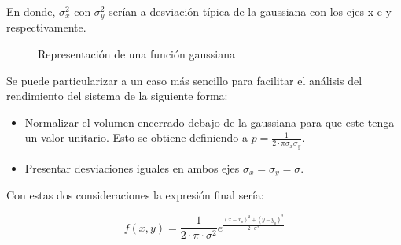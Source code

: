En donde, $\sigma^{2}_{x}$ con $\sigma^{2}_{y}$ serían a desviación típica de la gaussiana con los ejes x e y respectivamente.

\begin{figure}[htb]
  \begin{center}
    \caption{Representación de una función gaussiana}
    \label{FunGauss}
  \end{center}
\end{figure}


Se puede particularizar a un caso más sencillo para facilitar el análisis del rendimiento del sistema de la siguiente forma:

\begin{itemize}
	\item Normalizar el volumen encerrado debajo de la gaussiana para que este tenga un valor unitario. Esto se obtiene definiendo a $p=\frac{1}{2\cdot{\pi}\sigma_{x}\sigma_{y}}$.
	\item Presentar desviaciones iguales en ambos ejes $\sigma_{x}=\sigma_{y}=\sigma$.
\end{itemize}

Con estas dos consideraciones la expresión final sería:

\begin{equation}
	f\left(x,y\right)=\frac{1}{2\cdot{\pi}\cdot{\sigma^{2}}}e^{\frac{\left(x-x_{o}\right)^{2}+\left(y-y_{o}\right)^{2}}{2\cdot{\sigma^2}}}
\end{equation}


